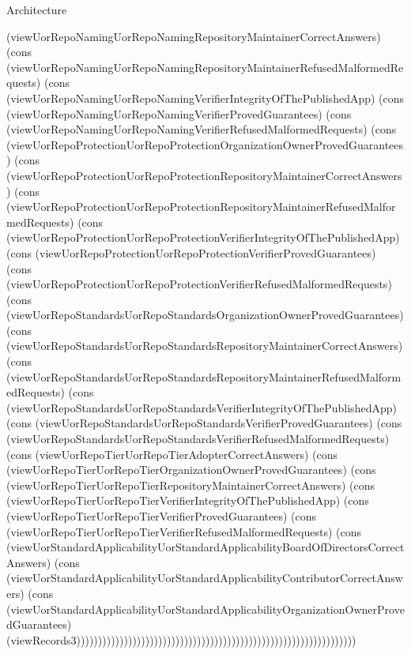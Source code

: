 \begin{lexlean}{Architecture}
\begin{semanticmodule}
{(viewUorRepoNamingUorRepoNamingRepositoryMaintainerCorrectAnswers) (cons (viewUorRepoNamingUorRepoNamingRepositoryMaintainerRefusedMalformedRequests) (cons (viewUorRepoNamingUorRepoNamingVerifierIntegrityOfThePublishedApp) (cons (viewUorRepoNamingUorRepoNamingVerifierProvedGuarantees) (cons (viewUorRepoNamingUorRepoNamingVerifierRefusedMalformedRequests) (cons (viewUorRepoProtectionUorRepoProtectionOrganizationOwnerProvedGuarantees) (cons (viewUorRepoProtectionUorRepoProtectionRepositoryMaintainerCorrectAnswers) (cons (viewUorRepoProtectionUorRepoProtectionRepositoryMaintainerRefusedMalformedRequests) (cons (viewUorRepoProtectionUorRepoProtectionVerifierIntegrityOfThePublishedApp) (cons (viewUorRepoProtectionUorRepoProtectionVerifierProvedGuarantees) (cons (viewUorRepoProtectionUorRepoProtectionVerifierRefusedMalformedRequests) (cons (viewUorRepoStandardsUorRepoStandardsOrganizationOwnerProvedGuarantees) (cons (viewUorRepoStandardsUorRepoStandardsRepositoryMaintainerCorrectAnswers) (cons (viewUorRepoStandardsUorRepoStandardsRepositoryMaintainerRefusedMalformedRequests) (cons (viewUorRepoStandardsUorRepoStandardsVerifierIntegrityOfThePublishedApp) (cons (viewUorRepoStandardsUorRepoStandardsVerifierProvedGuarantees) (cons (viewUorRepoStandardsUorRepoStandardsVerifierRefusedMalformedRequests) (cons (viewUorRepoTierUorRepoTierAdopterCorrectAnswers) (cons (viewUorRepoTierUorRepoTierOrganizationOwnerProvedGuarantees) (cons (viewUorRepoTierUorRepoTierRepositoryMaintainerCorrectAnswers) (cons (viewUorRepoTierUorRepoTierVerifierIntegrityOfThePublishedApp) (cons (viewUorRepoTierUorRepoTierVerifierProvedGuarantees) (cons (viewUorRepoTierUorRepoTierVerifierRefusedMalformedRequests) (cons (viewUorStandardApplicabilityUorStandardApplicabilityBoardOfDirectorsCorrectAnswers) (cons (viewUorStandardApplicabilityUorStandardApplicabilityContributorCorrectAnswers) (cons (viewUorStandardApplicabilityUorStandardApplicabilityOrganizationOwnerProvedGuarantees) (viewRecords3)))))))))))))))))))))))))))))))))))))))))))))))))))))))))))))))))
}


\end{semanticmodule}
\end{lexlean}
